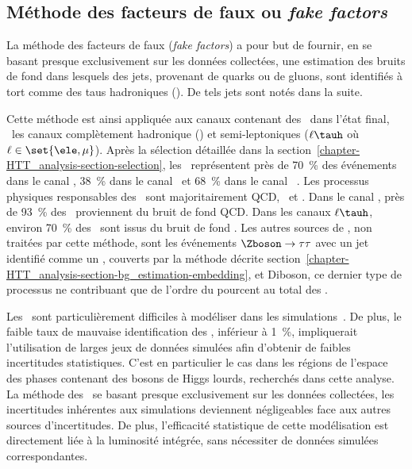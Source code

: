 \subsection{Méthode des facteurs de faux ou \emph{fake factors}}\label{chapter-HTT_analysis-section-bg_estimation-FF_method}
La méthode des facteurs de faux (\emph{fake factors}) a pour but de fournir, en se basant presque exclusivement sur les données collectées, une estimation des bruits de fond dans lesquels des jets, provenant de quarks ou de gluons, sont identifiés à tort comme des taus hadroniques (\tauh).
De tels jets sont notés \og \ftauh \fg{} dans la suite.
\par
Cette méthode est ainsi appliquée aux canaux contenant des \tauh\ dans l'état final, \ie\ les canaux complètement hadronique (\tauh\tauh) et semi-leptoniques ($\ell\tauh$ où $\ell\in\set{\ele,\mu}$).
Après la sélection détaillée dans la section~\ref{chapter-HTT_analysis-section-selection},
les \ftauhs\ représentent près de \SI{70}{\%} des événements dans le canal \tauh\tauh, \SI{38}{\%} dans le canal \mu\tauh\ et \SI{68}{\%} dans le canal \ele\tauh~\cite{CMS-NOTE-2018-257,CMS-NOTE-2019-170}.
Les processus physiques responsables des \ftauhs\ sont majoritairement QCD, \Wjets\ et \ttbar.
Dans le canal \tauh\tauh, près de \SI{93}{\%} des \ftauhs\ proviennent du bruit de fond QCD.
Dans les canaux $\ell\tauh$, environ \SI{70}{\%} des \ftauhs\ sont issus du bruit de fond \Wjets.
Les autres sources de \ftauhs, non traitées par cette méthode, sont les événements $\Zboson\to\tau\tau$ avec un jet identifié comme un \tauh, couverts par la méthode décrite section~\ref{chapter-HTT_analysis-section-bg_estimation-embedding}, et Diboson, ce dernier type de processus ne contribuant que de l'ordre du pourcent au total des \ftauhs.
\par
Les \ftauhs\ sont particulièrement difficiles à modéliser dans les simulations~\cite{CMS-NOTE-2018-257,CMS-NOTE-2019-170}.
De plus, le faible taux de mauvaise identification des \tauh, inférieur à \SI{1}{\%}, impliquerait l'utilisation de larges jeux de données simulées afin d'obtenir de faibles incertitudes statistiques.
C'est en particulier le cas dans les régions de l'espace des phases contenant des bosons de Higgs lourds, recherchés dans cette analyse.
La méthode des \fakefactors\ se basant presque exclusivement sur les données collectées, les incertitudes inhérentes aux simulations deviennent négligeables face aux autres sources d'incertitudes.
De plus, l'efficacité statistique de cette modélisation est directement liée à la luminosité intégrée, sans nécessiter de données simulées correspondantes.
